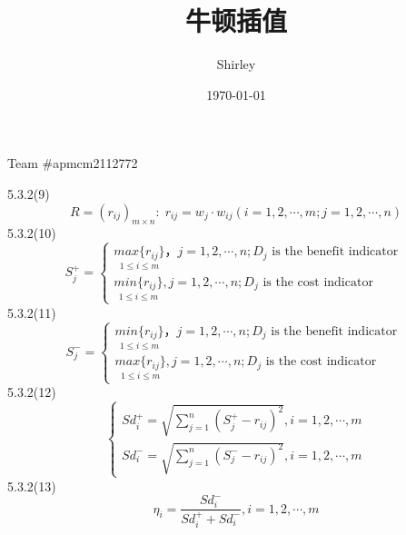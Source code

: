 \documentclass{article}%
\title{\kaishu 牛顿插值}
\author{Shirley}
\date{\today}
\begin{document}
	Team \#apmcm2112772
	
	
	5.3.2(9)
	\begin{equation}
		R=(r_{ij})_{m\times n}: \; r_{ij}=w_{j}\cdot w_{ij}(i=1,2,\cdots ,m;j=1,2,\cdots ,n)
	\end{equation}
	5.3.2(10)
	\begin{equation}
		S_{j}^{+}=\left\{\begin{array}{l}
			\underset{1\le i\le m}{max\{r_{i j}\}} ，j=1,2, \cdots, n;  D_{j} \text { is the benefit indicator } \\
			\underset{1\le i\le m}{min\{r_{i j}\}}, j=1,2, \cdots, n;  D_{j} \text { is the cost indicator }
		\end{array}\right.
	\end{equation}
	5.3.2(11)
	\begin{equation}
		S_{j}^{-}=\left\{\begin{array}{l}
			\underset{1\le i\le m}{min\{r_{i j}\}} ，j=1,2, \cdots, n;  D_{j} \text { is the benefit indicator } \\
			\underset{1\le i\le m}{max\{r_{i j}\}}, j=1,2, \cdots, n;  D_{j} \text { is the cost indicator }
		\end{array}\right.
	\end{equation}
	5.3.2(12)
	\begin{equation}
		\left\{\begin{matrix} 
			Sd_{i}^{+}=\sqrt{\sum_{j=1}^{n}(S_{j}^{+}-r_{ij})^{2}},i=1,2,\cdots ,m \\  
			Sd_{i}^{-}=\sqrt{\sum_{j=1}^{n}(S_{j}^{-}-r_{ij})^{2}},i=1,2,\cdots ,m 
		\end{matrix}\right. 
	\end{equation}
	5.3.2(13)
	\begin{equation}
		\eta _{i}=\frac{Sd_{i}^{-}}{Sd_{i}^{+}+Sd_{i}^{-}} ,i=1,2,\cdots ,m
	\end{equation}
\end{document}
